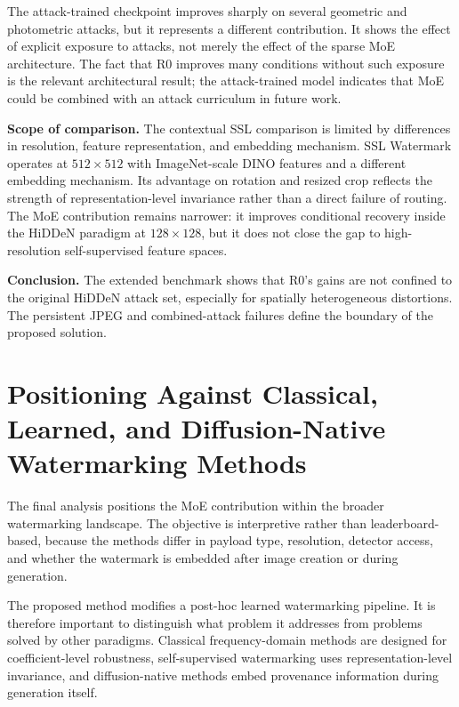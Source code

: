 ﻿\documentclass[12pt, a4paper, twoside]{report}
\numberwithin{equation}{chapter}
\begin{document}
The attack-trained checkpoint improves sharply on several geometric and photometric attacks, but it represents a different contribution. It shows the effect of explicit exposure to attacks, not merely the effect of the sparse MoE architecture. The fact that R0 improves many conditions without such exposure is the relevant architectural result; the attack-trained model indicates that MoE could be combined with an attack curriculum in future work.

\textbf{Scope of comparison.} The contextual SSL comparison is limited by differences in resolution, feature representation, and embedding mechanism. SSL Watermark operates at $512\times512$ with ImageNet-scale DINO features and a different embedding mechanism. Its advantage on rotation and resized crop reflects the strength of representation-level invariance rather than a direct failure of routing. The MoE contribution remains narrower: it improves conditional recovery inside the HiDDeN paradigm at $128\times128$, but it does not close the gap to high-resolution self-supervised feature spaces.

\textbf{Conclusion.} The extended benchmark shows that R0's gains are not confined to the original HiDDeN attack set, especially for spatially heterogeneous distortions. The persistent JPEG and combined-attack failures define the boundary of the proposed solution.

\section{Positioning Against Classical, Learned, and Diffusion-Native Watermarking Methods}
\label{sec:cross-paradigm}

The final analysis positions the MoE contribution within the broader watermarking landscape. The objective is interpretive rather than leaderboard-based, because the methods differ in payload type, resolution, detector access, and whether the watermark is embedded after image creation or during generation.

The proposed method modifies a post-hoc learned watermarking pipeline. It is therefore important to distinguish what problem it addresses from problems solved by other paradigms. Classical frequency-domain methods are designed for coefficient-level robustness, self-supervised watermarking uses representation-level invariance, and diffusion-native methods embed provenance information during generation itself.
\end{document}
